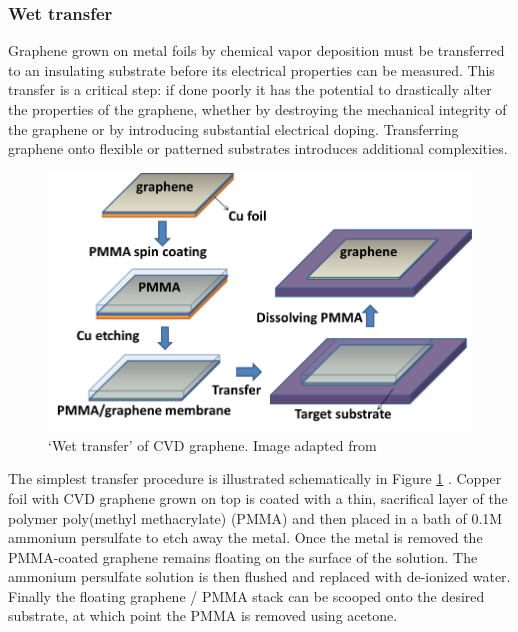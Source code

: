 \documentclass[edeposit,fullpage,draftthesis]{uiucthesis2009}
\begin{document}
            \subsubsection{Wet transfer}
            
            Graphene grown on metal foils by chemical vapor deposition must be transferred to 
        an insulating substrate before its electrical properties can be measured.
        This transfer is a critical step: if done poorly it has the potential to 
        drastically alter the properties of the graphene, whether by destroying
        the mechanical integrity of the graphene or by introducing substantial electrical doping.
        Transferring graphene onto flexible or patterned substrates introduces additional
        complexities. 
        
        \begin{figure}
            \centering
            \includegraphics[width=0.8\linewidth]{images/experimentaltechniques/wettransfer.png}
            \caption[Wet transfer of CVD graphene]{
                `Wet transfer' of CVD graphene.
                Image adapted from \cite{kumar2013synthesis}}
            \label{fig:wettransfer}
        \end{figure}

        The simplest transfer procedure is illustrated schematically in Figure \ref{fig:wettransfer} \cite{reina2008large, kim2009large, li2009large}.
        Copper foil with CVD graphene grown on top is coated with a thin, sacrifical layer of the 
        polymer poly(methyl methacrylate) (PMMA) and then placed in a bath of 0.1M ammonium persulfate
        to etch away the metal. Once the metal is removed the PMMA-coated graphene 
        remains floating on the surface of the solution. The ammonium persulfate solution is then flushed and replaced
        with de-ionized water.
        Finally the floating graphene / PMMA stack can be
        scooped onto the desired substrate, at which point the PMMA is removed using acetone.
        
\end{document}
